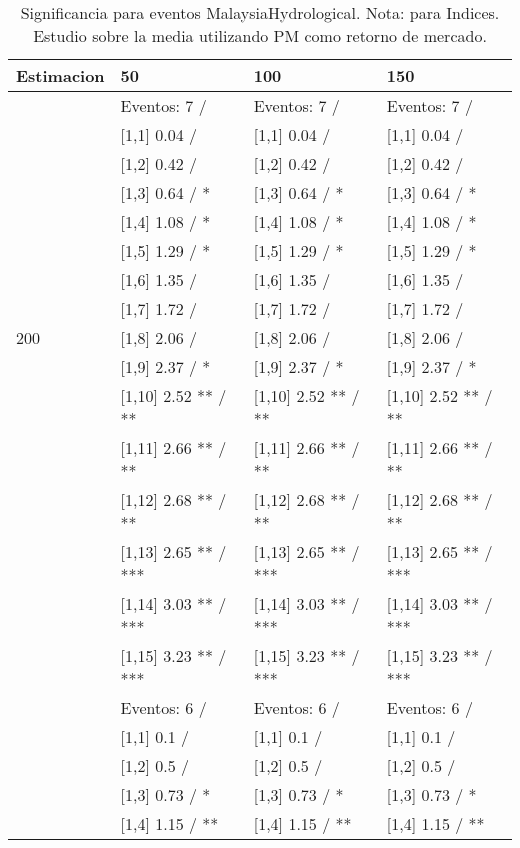 \begin{table}

\caption{Significancia para eventos MalaysiaHydrological. Nota: para Indices. Estudio sobre la media utilizando PM como retorno de mercado.}
\centering
\begin{tabular}[t]{llll}
\toprule
Estimacion & 50 & 100 & 150\\
\midrule
 & Eventos:  7 / & Eventos:  7 / & Eventos:  7 /\\
 & {}[1,1] 0.04  / & {}[1,1] 0.04  / & {}[1,1] 0.04  /\\
 & {}[1,2] 0.42  / & {}[1,2] 0.42  / & {}[1,2] 0.42  /\\
 & {}[1,3] 0.64  / * & {}[1,3] 0.64  / * & {}[1,3] 0.64  / *\\
 & {}[1,4] 1.08  / * & {}[1,4] 1.08  / * & {}[1,4] 1.08  / *\\
\addlinespace
 & {}[1,5] 1.29  / * & {}[1,5] 1.29  / * & {}[1,5] 1.29  / *\\
 & {}[1,6] 1.35  / & {}[1,6] 1.35  / & {}[1,6] 1.35  /\\
 & {}[1,7] 1.72  / & {}[1,7] 1.72  / & {}[1,7] 1.72  /\\
200 & {}[1,8] 2.06  / & {}[1,8] 2.06  / & {}[1,8] 2.06  /\\
 & {}[1,9] 2.37  / * & {}[1,9] 2.37  / * & {}[1,9] 2.37  / *\\
\addlinespace
 & {}[1,10] 2.52 ** / ** & {}[1,10] 2.52 ** / ** & {}[1,10] 2.52 ** / **\\
 & {}[1,11] 2.66 ** / ** & {}[1,11] 2.66 ** / ** & {}[1,11] 2.66 ** / **\\
 & {}[1,12] 2.68 ** / ** & {}[1,12] 2.68 ** / ** & {}[1,12] 2.68 ** / **\\
 & {}[1,13] 2.65 ** / *** & {}[1,13] 2.65 ** / *** & {}[1,13] 2.65 ** / ***\\
 & {}[1,14] 3.03 ** / *** & {}[1,14] 3.03 ** / *** & {}[1,14] 3.03 ** / ***\\
\addlinespace
 & {}[1,15] 3.23 ** / *** & {}[1,15] 3.23 ** / *** & {}[1,15] 3.23 ** / ***\\
 & Eventos:  6 / & Eventos:  6 / & Eventos:  6 /\\
 & {}[1,1] 0.1  / & {}[1,1] 0.1  / & {}[1,1] 0.1  /\\
 & {}[1,2] 0.5  / & {}[1,2] 0.5  / & {}[1,2] 0.5  /\\
 & {}[1,3] 0.73  / * & {}[1,3] 0.73  / * & {}[1,3] 0.73  / *\\
\addlinespace
 & {}[1,4] 1.15  / ** & {}[1,4] 1.15  / ** & {}[1,4] 1.15  / **\\

\end{tabular}
\end{table}
